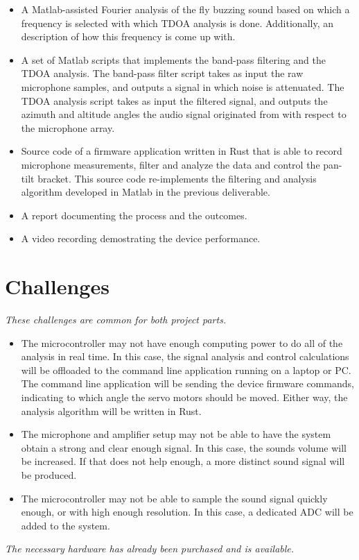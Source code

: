 \documentclass[a4paper]{article}
\begin{document}
\begin{itemize}
    \item A Matlab-assisted Fourier analysis of the fly buzzing sound based on which a frequency is selected with which TDOA analysis is done. Additionally, an description of how this frequency is come up with.
    \item A set of Matlab scripts that implements the band-pass filtering and the TDOA analysis. The band-pass filter script takes as input the raw microphone samples, and outputs a signal in which noise is attenuated. The TDOA analysis script takes as input the filtered signal, and outputs the azimuth and altitude angles the audio signal originated from with respect to the microphone array.
    \item Source code of a firmware application written in Rust that is able to record microphone measurements, filter and analyze the data and control the pan-tilt bracket. This source code re-implements the filtering and analysis algorithm developed in Matlab in the previous deliverable.
    \item A report documenting the process and the outcomes.
    \item A video recording demostrating the device performance.
\end{itemize}

\section{Challenges}
\textit{These challenges are common for both project parts.}
\begin{itemize}
    \item The microcontroller may not have enough computing power to do all of the analysis in real time. In this case, the signal analysis and control calculations will be offloaded to the command line application running on a laptop or PC. The command line application will be sending the device firmware commands, indicating to which angle the servo motors should be moved. Either way, the analysis algorithm will be written in Rust.
    \item The microphone and amplifier setup may not be able to have the system obtain a strong and clear enough signal. In this case, the sounds volume will be increased. If that does not help enough, a more distinct sound signal will be produced.
    \item The microcontroller may not be able to sample the sound signal quickly enough, or with high enough resolution. In this case, a dedicated ADC will be added to the system.
\end{itemize}
\textit{The necessary hardware has already been purchased and is available.}



\end{document}

